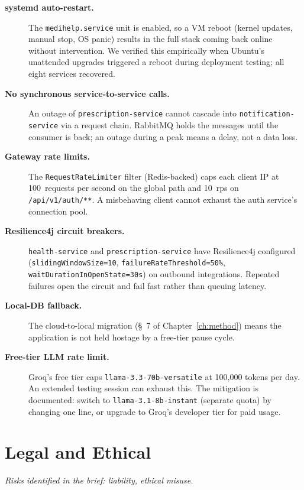 \documentclass[12pt]{caltech_thesis}
\begin{document}
\begin{description}
    \item[\textbf{systemd auto-restart.}] The \texttt{medihelp.service}
    unit is enabled, so a VM reboot (kernel updates, manual stop, OS
    panic) results in the full stack coming back online without
    intervention. We verified this empirically when Ubuntu's unattended
    upgrades triggered a reboot during deployment testing; all eight
    services recovered.
    \item[\textbf{No synchronous service-to-service calls.}] An outage
    of \texttt{prescription-service} cannot cascade into
    \texttt{notification-service} via a request chain. RabbitMQ holds
    the messages until the consumer is back; an outage during a peak
    means a delay, not a data loss.
    \item[\textbf{Gateway rate limits.}] The
    \texttt{RequestRateLimiter} filter (Redis-backed) caps each client
    IP at 100~requests per second on the global path and 10~rps on
    \texttt{/api/v1/auth/**}. A misbehaving client cannot exhaust the
    auth service's connection pool.
    \item[\textbf{Resilience4j circuit breakers.}]
    \texttt{health-service} and \texttt{prescription-service} have
    Resilience4j configured (\texttt{slidingWindowSize=10},
    \texttt{failureRateThreshold=50\%},
    \texttt{waitDurationInOpenState=30s}) on outbound integrations.
    Repeated failures open the circuit and fail fast rather than
    queuing latency.
    \item[\textbf{Local-DB fallback.}] The cloud-to-local migration
    (\S~7 of Chapter~\ref{ch:method}) means the application is not
    held hostage by a free-tier pause cycle.
    \item[\textbf{Free-tier LLM rate limit.}] Groq's free tier caps
    \texttt{llama-3.3-70b-versatile} at 100{,}000 tokens per day. An
    extended testing session can exhaust this. The mitigation is
    documented: switch to \texttt{llama-3.1-8b-instant} (separate
    quota) by changing one line, or upgrade to Groq's developer tier
    for paid usage.
\end{description}

\section{Legal and Ethical}

\textit{Risks identified in the brief: liability, ethical misuse.}
\end{document}
